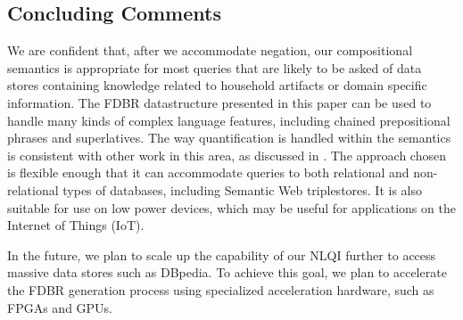 \documentclass[../main.tex]{subfiles}
\begin{document}
\begin{refsection}
\section{Concluding Comments}

We are confident that, after we accommodate negation, our compositional semantics is appropriate for most queries that are likely to be asked of data stores containing knowledge related to household artifacts or domain specific information.
The FDBR datastructure presented in this paper can be used to handle many kinds of complex language features, including chained prepositional phrases and superlatives.  The way quantification is handled within the semantics is consistent with other work in this area, as discussed in .
The approach chosen is flexible enough that it can accommodate queries to both relational and non-relational types of databases, including Semantic Web triplestores.  It is also suitable for use on low power devices, which may be useful for applications on the Internet of Things (IoT).

In the future, we plan to scale up the capability of our NLQI further to access massive data stores such as DBpedia.  To achieve this goal, we plan to accelerate the FDBR generation process using specialized acceleration hardware, such as FPGAs and GPUs.

\printbibliography[heading=subbibintoc]
\end{refsection}
\end{document}

